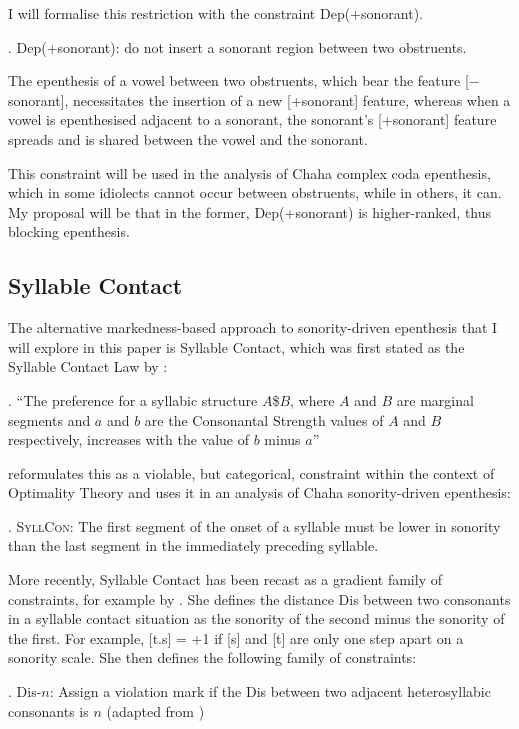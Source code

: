 \documentclass[12pt]{article}
\begin{document}
I will formalise this restriction with the constraint {\sc Dep}(+sonorant). 

\ex. {\sc Dep}(+sonorant): do not insert a sonorant region between two obstruents.

The epenthesis of a vowel between two obstruents, which bear the feature [$-$sonorant], necessitates the insertion of a new [+sonorant] feature, whereas when a vowel is epenthesised adjacent to a sonorant, the sonorant's [+sonorant] feature spreads and is shared between the vowel and the sonorant.

This constraint will be used in the analysis of Chaha complex coda epenthesis, which in some idiolects cannot occur between obstruents, while in others, it can. My proposal will be that in the former, {\sc Dep}(+sonorant) is higher-ranked, thus blocking epenthesis.

\subsection{Syllable Contact} 

The alternative markedness-based approach to sonority-driven epenthesis that I will explore in this paper is Syllable Contact, which was first stated as the Syllable Contact Law by \citet{murray.vennemann.1983}:

\ex. ``The preference for a syllabic structure $A$\$$B$, where $A$ and $B$ are marginal segments and $a$ and $b$ are the Consonantal Strength
values of $A$ and $B$ respectively, increases with the value of $b$ minus $a$'' \citep{murray.vennemann.1983}

\citet{rose.2000} reformulates this as a violable, but categorical, constraint within the context of Optimality Theory and uses it in an analysis of Chaha sonority-driven epenthesis:

\ex.  \textsc{SyllCon}: The first segment of the onset of a syllable must be lower in sonority than the last segment in the immediately preceding syllable.

More recently, Syllable Contact has been recast as a gradient family of constraints, for example by \citet{gouskova.2002, gouskova.2004}.  She defines the distance {\sc Dis} between two consonants in a syllable contact situation as the sonority of the second minus the sonority of the first.  For example, [t.s] = +1 if [s] and [t] are only one step apart on a sonority scale.  She then defines the following family of constraints:

\ex. {\sc *Dis-}$n$: Assign a violation mark if the {\sc Dis} between two adjacent heterosyllabic consonants is $n$ (adapted from \citep{gouskova.2002})
\end{document}
